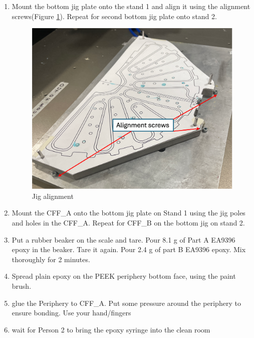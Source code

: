 \documentclass[12pt]{cornelltfpxsop}
\begin{document}
\begin{paracol}{2}
\begin{enumerate}
    \item Mount the bottom jig plate onto the stand 1 and align it using the alignment screws(Figure \ref{JigAlignment}). Repeat for second bottom jig plate onto stand 2.
    \begin{figure}
        \centering
        \includegraphics[width=0.8\linewidth]{img/jig_alignment.png}
        \caption{Jig alignment}
        \label{JigAlignment}
    \end{figure}
    \item Mount the CFF\_A onto the bottom jig plate on Stand 1 using the jig poles and holes in the CFF\_A. Repeat for CFF\_B on the bottom jig on stand 2.
    \item Put a rubber beaker on the scale and tare. Pour 8.1 g of Part A EA9396 epoxy in the beaker. Tare it again. Pour 2.4 g of part B EA9396 epoxy. Mix thoroughly for 2 minutes.   
    \item Spread plain epoxy on the PEEK periphery bottom face, using the paint brush.
    \item glue the Periphery to CFF\_A. Put some pressure around the periphery to ensure bonding. Use your hand/fingers 
    \item wait for Person 2 to bring the epoxy syringe into the clean room


\end{enumerate}
\end{paracol}
\end{document}
